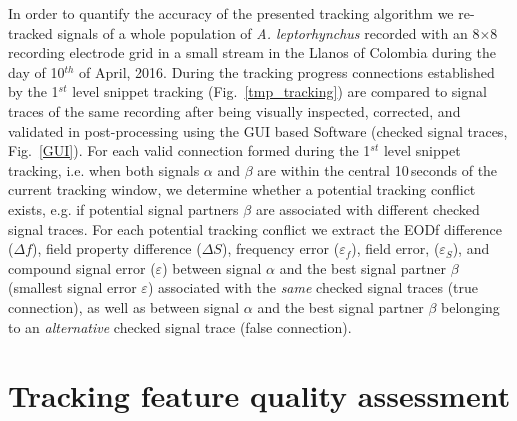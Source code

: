 \documentclass[11pt,pdftex]{article}
\newcommand{\fref}[1]{\textup{\ref{#1}}}
\newcommand{\fig}{Fig.}
\newcommand{\figs}{Figs.}
\newcommand{\figref}[1]{\fig~\fref{#1}}
\newcommand{\figsref}[1]{\figs~\fref{#1}}
\newcommand{\lepto}{\textit{A. leptorhynchus}}
\begin{document}
In order to quantify the accuracy of the presented tracking algorithm we re-tracked signals of a whole population of \lepto{} recorded with an 8$\times$8 recording electrode grid in a small stream in the Llanos of Colombia during the day of 10$^{th}$ of April, 2016. During the tracking progress connections established by the 1$^{st}$ level snippet tracking (\figref{tmp_tracking}) are compared to signal traces of the same recording after being visually inspected, corrected, and validated in post-processing using the GUI based Software (checked signal traces, \figref{GUI}). For each valid connection formed during the 1$^{st}$ level snippet tracking, i.e. when both signals $\alpha$ and $\beta$ are within the central 10\,seconds of the current tracking window, we determine whether a potential tracking conflict exists, e.g. if potential signal partners $\beta$ are associated with different checked signal traces. For each potential tracking conflict we extract the EODf difference ($\Delta f$), field property difference ($\Delta S$), frequency error ($\varepsilon_f$), field error, ($\varepsilon_S$), and compound signal error ($\varepsilon$) between signal $\alpha$ and the best signal partner $\beta$ (smallest signal error $\varepsilon$) associated with the \emph{same} checked signal traces (true connection), as well as between signal $\alpha$ and the best signal partner $\beta$ belonging to an \emph{alternative} checked signal trace (false connection). 

\section{Tracking feature quality assessment}
\end{document}
